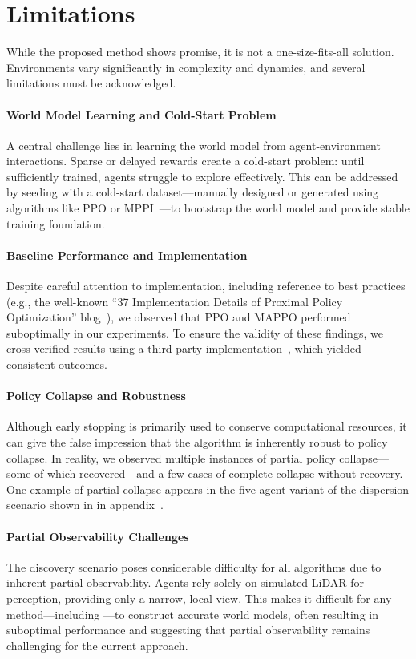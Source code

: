 \section{Limitations}

While the proposed method shows promise, it is not a one-size-fits-all solution. Environments vary significantly in complexity and dynamics, and several limitations must be acknowledged.

\paragraph{World Model Learning and Cold-Start Problem}
A central challenge lies in learning the world model from agent-environment interactions. Sparse or delayed rewards create a cold-start problem: until sufficiently trained, agents struggle to explore effectively. This can be addressed by seeding with a cold-start dataset---manually designed or generated using algorithms like PPO or MPPI~\cite{Alvarez24}---to bootstrap the world model and provide stable training foundation.

\paragraph{Baseline Performance and Implementation}
Despite careful attention to implementation, including reference to best practices (e.g., the well-known ``37 Implementation Details of Proximal Policy Optimization'' blog~\cite{Shengyi22}), we observed that PPO and MAPPO performed suboptimally in our experiments. To ensure the validity of these findings, we cross-verified results using a third-party implementation~\cite{Bettini24}, which yielded consistent outcomes.

\paragraph{Policy Collapse and Robustness}
Although early stopping is primarily used to conserve computational resources, it can give the false impression that the algorithm is inherently robust to policy collapse. In reality, we observed multiple instances of partial policy collapse---some of which recovered---and a few cases of complete collapse without recovery. One example of partial collapse appears in the five-agent variant of the dispersion scenario shown in  in appendix~\cite{appendix}.

\paragraph{Partial Observability Challenges}
The discovery scenario poses considerable difficulty for all algorithms due to inherent partial observability. Agents rely solely on simulated LiDAR for perception, providing only a narrow, local view. This makes it difficult for any method---including \fname{}---to construct accurate world models, often resulting in suboptimal performance and suggesting that partial observability remains challenging for the current approach.

